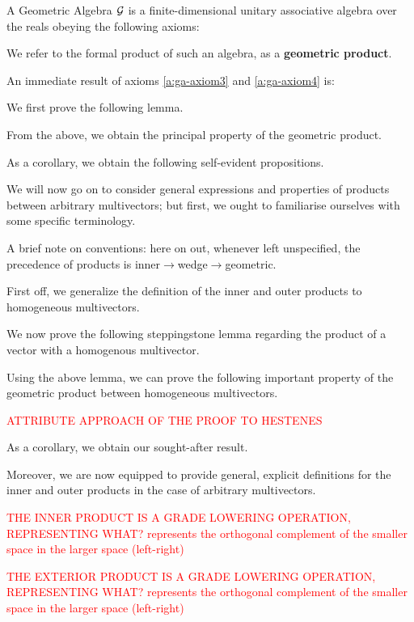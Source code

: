 A Geometric Algebra $\mathcal{G}$  is a finite-dimensional unitary associative algebra over the reals obeying the following axioms:

We refer to the formal product of such an algebra, as a \textbf{geometric product}.

An immediate result of axioms \ref{a:ga-axiom3} and \ref{a:ga-axiom4} is:


We first prove the following lemma.



From the above, we obtain the principal property of the geometric product.



As a corollary, we obtain the following self-evident propositions.



We will now go on to consider general expressions and properties of products between arbitrary multivectors; but first, we ought to familiarise ourselves with some specific terminology.

A brief note on conventions: here on out, whenever left unspecified, the precedence of products is inner$\to$wedge$\to$geometric.

First off, we generalize the definition of the inner and outer products to homogeneous multivectors.



We now prove the following steppingstone lemma regarding the product of a vector with a homogenous multivector.



Using the above lemma, we can prove the following important property of the geometric product between homogeneous multivectors.

%
\textcolor{red}{ATTRIBUTE APPROACH OF THE PROOF TO HESTENES}

As a corollary, we obtain our sought-after result.



Moreover, we are now equipped to provide general, explicit definitions for the inner and outer products in the case of arbitrary multivectors.

\textcolor{red}{THE INNER PRODUCT IS A GRADE LOWERING OPERATION, REPRESENTING WHAT? represents the orthogonal complement of the smaller space in the larger space (left-right)}

\textcolor{red}{THE EXTERIOR PRODUCT IS A GRADE LOWERING OPERATION, REPRESENTING WHAT? represents the orthogonal complement of the smaller space in the larger space (left-right)}

